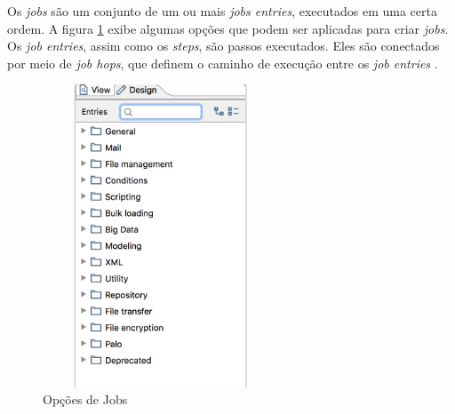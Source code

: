 Os \textit{jobs} são um conjunto de um ou mais \textit{jobs entries}, executados em uma certa ordem. A figura \ref{jobsOptions} exibe algumas opções que podem ser aplicadas para criar \textit{jobs}. Os\textit{ job entries}, assim como os \textit{steps}, são passos executados. Eles são conectados por meio de \textit{job hops}, que definem o caminho de execução entre os \textit{job entries} \citep{kettle}.
\begin{figure}[H]
\centering
\includegraphics[width=7cm, height=9cm]{imagens/opcoes_de_jobs.png}
\caption{Opções de Jobs}
\label{jobsOptions}
\end{figure}
